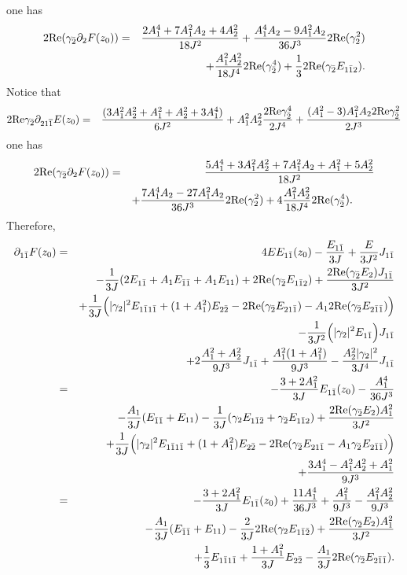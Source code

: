 \documentclass[12pt]{amsart}
\def\1bar{\overline{1}}
\def\d{\partial}
\def\d{\partial}
\begin{document}
one has
\begin{eqnarray*}
2\hbox{Re}(\gamma_{\bar2}  \d_2 F(z_0))
&=&{2A_1^4+7A_1^2A_2+4A_2^2 \over 18 J^2} +{A_1^4A_2-9A_1^2A_2\over 36 J^3} 2\hbox{Re}(\gamma_2^2)\\
&&+{A_1^2A_2^2 \over 18J^4} 2\hbox{Re}(\gamma_{\bar2}^4)+{1\over 3} 2\hbox{Re} (\gamma_{\bar2}  E_{1\bar1 2}).
\end{eqnarray*}
Notice that
\begin{eqnarray*}
2\hbox{Re} \gamma_{\bar2} \d_{2 1 \1bar } E(z_0)
&=&{(3A_1^2A_2^2+A_1^2+A_2^2+3A_1^4) \over 6 J^2} + A_1^2A_2^2{ 2\hbox{Re} \gamma_{\bar2}^4  \over 2 J^4} +{ (A_1^2-3)A_1^2 A_22\hbox{Re} \gamma_{\bar2} ^2\over 2 J^3} 
\end{eqnarray*} 
one has
\begin{eqnarray}
2\hbox{Re}(\gamma_{\bar2}  \d_2 F(z_0))
&=&{5A_1^4+3A_1^2A_2^2+7A_1^2A_2+A_1^2 +5A_2^2 \over 18 J^2} \nonumber\\
&&+{7A_1^4A_2-27A_1^2A_2\over 36 J^3} 2\hbox{Re}(\gamma_2^2)+4{A_1^2A_2^2 \over 18J^4} 2\hbox{Re}(\gamma_{\bar2}^4).\qquad
\end{eqnarray}
Therefore,
 \begin{eqnarray*}
\d_{1\bar1} F(z_0)&=&4 E E_{1\bar1}(z_0)-{E_{1\bar1}\over 3 J}+{E\over 3J^2} J_{1\bar1}\\
&& -{1\over 3J} ( 2 E_{1\bar1} +A_1 E_{\bar1 \bar1}+A_1 E_{11})+2\hbox{Re}(\gamma_{\bar2 }E_{1 \bar12})
+{2\hbox{Re}(\gamma_{\bar2} E_2) J_{1\bar1} \over 3 J^2}\\
&&+{1\over 3J}\Big(|\gamma_2|^2 E_{1\bar1 1\bar1}+ (1+A_1^2)E_{2\bar2}-2\hbox{Re} ( \gamma_{\bar2} E_{2 1 \bar1} )-A_12\hbox{Re}(\gamma_{\bar2} E_{2\bar1 \bar1})\Big)\\
&&-{1\over 3J^2}\Big(|\gamma_2|^2 E_{1\bar1}\Big) J_{1\bar1}\\
&&+2{A_1^2 +A_2^2 \over 9 J^3} J_{1\bar1} +{A_1^2 (1+A_1^2) \over 9J^3}-{A_2^2 |\gamma_2|^2\over 3J^4} J_{1\bar1}\\
&=&-{3+2A_1^2 \over 3J}  E_{1\bar1}(z_0)-{A_1^4 \over 36J^3} \\
&& -{A_1 \over 3J} (  E_{\bar1 \bar1}+E_{11})-{1\over 3J}(\gamma_2 E_{1 \bar1 \bar2}+\gamma_{\bar2} E_{1 \bar1 2})
+{2\hbox{Re}(\gamma_{\bar2} E_2) A_1^2 \over 3 J^2}\\
&&+{1\over 3J}\Big(|\gamma_2|^2 E_{1\bar1 1\bar1}+ (1+A_1^2)E_{2\bar2}-2\hbox{Re} ( \gamma_{\bar2} E_{2 1 \bar1} -A_1\gamma_{\bar2} E_{2\bar1 \bar1})\Big)\\
&&+{3A_1^4 -A_1^2A_2^2+A_1^2  \over 9 J^3}  \\
&=&-{3+2A_1^2 \over 3J}  E_{1\bar1}(z_0)+{11 A_1^4 \over 36J^3}+{A_1^2  \over 9J^3}-{A_1^2 A_2^2 \over 9J^3}  \\
&& -{A_1 \over 3J} (  E_{\bar1 \bar1}+E_{11})-{2\over 3J} 2\hbox{Re} (\gamma_2 E_{1 \bar1 \bar2})
+{2\hbox{Re}(\gamma_{\bar2} E_2) A_1^2 \over 3 J^2}\\
&&+{1\over 3} E_{1\bar1 1\bar1}+{1+A_1^2 \over 3J}E_{2\bar2}-{A_1\over 3J} 2\hbox{Re} (\gamma_{\bar2} E_{2\bar1 \bar1}).
\end{eqnarray*}
\end{document}

